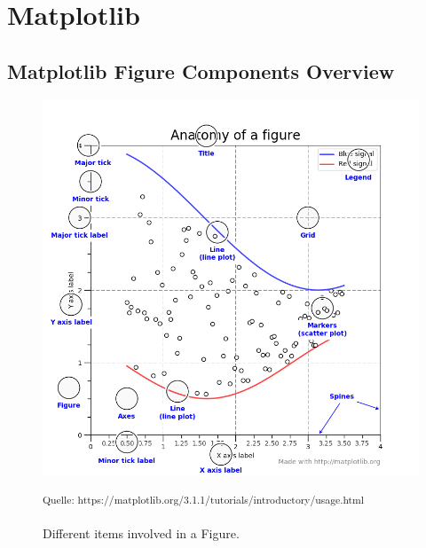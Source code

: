 \clearpage





\section{Matplotlib}
\label{sec:appendix:matplotlib}


\subsection{Matplotlib Figure Components Overview}

\begin{figure}[h]
    \centering
    \includegraphics[width=14cm]{resources/img/MatplotlibContent}
    \caption{Different items involved in a Figure.}
    \small\textsuperscript{Quelle: https://matplotlib.org/3.1.1/tutorials/introductory/usage.html}
    \label{a:fig:matplotlib:content}
\end{figure}

\clearpage

